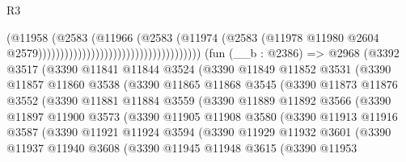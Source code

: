 \begin{lexlean}{R3}
\begin{coremodule}
                                                                (@11958
                                                                  (@2583
                                                                    (@11966
                                                                      (@2583
                                                                        (@11974
                                                                          (@2583
                                                                            (@11978
                                                                              @11980
                                                                              @2604
                                                                              @2579)))))))))))))))))))))))))))))))))))))
    (fun (__b : @2386) =>
    @2968
      (@3392
        @3517
        (@3390
          @11841
          @11844
          @3524
          (@3390
            @11849
            @11852
            @3531
            (@3390
              @11857
              @11860
              @3538
              (@3390
                @11865
                @11868
                @3545
                (@3390
                  @11873
                  @11876
                  @3552
                  (@3390
                    @11881
                    @11884
                    @3559
                    (@3390
                      @11889
                      @11892
                      @3566
                      (@3390
                        @11897
                        @11900
                        @3573
                        (@3390
                          @11905
                          @11908
                          @3580
                          (@3390
                            @11913
                            @11916
                            @3587
                            (@3390
                              @11921
                              @11924
                              @3594
                              (@3390
                                @11929
                                @11932
                                @3601
                                (@3390
                                  @11937
                                  @11940
                                  @3608
                                  (@3390
                                    @11945
                                    @11948
                                    @3615
                                    (@3390
                                      @11953

\end{coremodule}
\end{lexlean}
